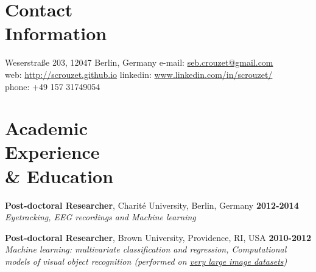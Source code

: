 \documentclass[margin,line]{resume}
\begin{document}

\begin{resume}

    
    \vspace{3mm}
    \section{\mysidestyle Contact\\Information}
    Weserstraße 203, 12047 Berlin, Germany            \hfill e-mail: \href{mailto:seb.crouzet@gmail.com}{seb.crouzet@gmail.com} \\
    web: \url{http://scrouzet.github.io} \hfill linkedin: \url{www.linkedin.com/in/scrouzet/}\\
    \hfill phone: +49 157 31749054 \\ 

    \vspace{3mm}
    \section{\mysidestyle  Academic \\ Experience\\ \& Education  }
    
  \textbf{Post-doctoral Researcher}, Charité University, Berlin, Germany \hfill \textbf{2012-2014}\\
	\textsl{Eyetracking, EEG recordings and Machine learning}
  	
	\vspace{-1.5mm}		
	\textbf{Post-doctoral Researcher}, Brown University, Providence, RI, USA \hfill \textbf{2010-2012}\\
	\textsl{Machine learning: multivariate classification and regression, Computational models of visual object recognition (performed on \href{http://www.image-net.org}{very large image datasets})}


\end{resume}
\end{document}
